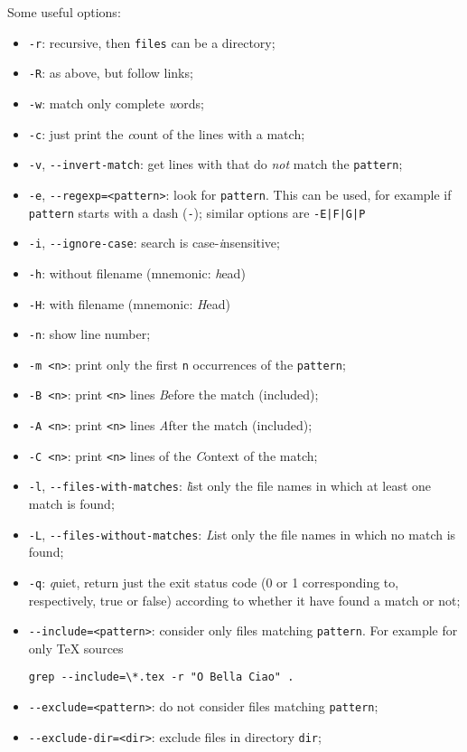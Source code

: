 \documentclass[a4paper,12pt,%
              final%
              ]{article}
\begin{document}
Some useful options:
\begin{itemize}
  \item \texttt{-r}: recursive, then \texttt{files} can be a directory;
  \item \texttt{-R}: as above, but follow links;
  \item \texttt{-w}: match only complete \emph{w}ords;
  \item \texttt{-c}: just print the \emph{c}ount of the lines with a match;
  \item \texttt{-v}, \verb|--invert-match|: get lines with that do \emph{not} match the \texttt{pattern};
  \item \texttt{-e}, \verb|--regexp=<pattern>|: look for \texttt{pattern}. This can be used, for example if \texttt{pattern} starts with a dash (\texttt{-}); similar options are \verb!-E|F|G|P!
  \item \texttt{-i}, \verb|--ignore-case|: search is case-\emph{i}nsensitive;
  \item \texttt{-h}: without filename (mnemonic: \emph{h}ead)
  \item \texttt{-H}: with filename (mnemonic: \emph{H}ead)
  \item \texttt{-n}: show line number;
  \item \texttt{-m <n>}: print only the first \texttt{n} occurrences of the \texttt{pattern};
  \item \texttt{-B <n>}: print \texttt{<n>} lines \emph{B}efore the match (included);
  \item \texttt{-A <n>}: print \texttt{<n>} lines \emph{A}fter the match (included);
  \item \texttt{-C <n>}: print \texttt{<n>} lines of the \emph{C}ontext of the match;
  \item \texttt{-l}, \verb|--files-with-matches|: \emph{l}ist only the file names in which at least one match is found;
  \item \texttt{-L}, \verb|--files-without-matches|: \emph{L}ist only the file names in which no match is found;
  \item \texttt{-q}: \emph{q}uiet, return just the exit status code (0 or 1 corresponding to, respectively, true or false) according to whether it have found a match or not;
  \item \verb|--include=<pattern>|: consider only files matching \texttt{pattern}. For example for only \TeX{} sources
\begin{verbatim}
grep --include=\*.tex -r "O Bella Ciao" .
\end{verbatim}
  \item \verb|--exclude=<pattern>|: do not consider files matching \texttt{pattern};
  \item \verb|--exclude-dir=<dir>|: exclude files in directory \texttt{dir};
\end{itemize}
\end{document}
